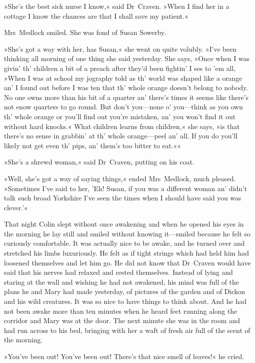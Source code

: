 »She's the best sick nurse I know,« said Dr~Craven. »When I find her in a cottage I know the chances are that I shall save my patient.«

Mrs~Medlock smiled. She was fond of Susan Sowerby.

»She's got a way with her, has Susan,« she went on quite volubly. »I've been thinking all morning of one thing she said yesterday. She says, »Once when I was givin' th' children a bit of a preach after they'd been fightin' I ses to 'em all, »When I was at school my jography told as th' world was shaped like a orange an' I found out before I was ten that th' whole orange doesn't belong to nobody. No one owns more than his bit of a quarter an' there's times it seems like there's not enow quarters to go round. But don't you—none o' you—think as you own th' whole orange or you'll find out you're mistaken, an' you won't find it out without hard knocks.« What children learns from children,« she says, »is that there's no sense in grabbin' at th' whole orange—peel an' all. If you do you'll likely not get even th' pips, an' them's too bitter to eat.««

»She's a shrewd woman,« said Dr~Craven, putting on his coat.

»Well, she's got a way of saying things,« ended Mrs~Medlock, much pleased. »Sometimes I've said to her, 'Eh! Susan, if you was a different woman an' didn't talk such broad Yorkshire I've seen the times when I should have said you was clever.'«

That night Colin slept without once awakening and when he opened his eyes in the morning he lay still and smiled without knowing it—smiled because he felt so curiously comfortable. It was actually nice to be awake, and he turned over and stretched his limbs luxuriously. He felt as if tight strings which had held him had loosened themselves and let him go. He did not know that Dr~Craven would have said that his nerves had relaxed and rested themselves. Instead of lying and staring at the wall and wishing he had not awakened, his mind was full of the plans he and Mary had made yesterday, of pictures of the garden and of Dickon and his wild creatures. It was so nice to have things to think about. And he had not been awake more than ten minutes when he heard feet running along the corridor and Mary was at the door. The next minute she was in the room and had run across to his bed, bringing with her a waft of fresh air full of the scent of the morning.

»You've been out! You've been out! There's that nice smell of leaves!« he cried.

